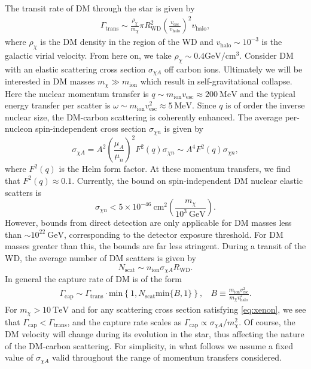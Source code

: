 \documentclass[preprintnumbers,amsmath,amssymb,prd,superscriptaddress]{revtex4}
\newcommand{\TeV}{\text{TeV}}
\newcommand{\GeV}{\text{GeV}}
\newcommand{\MeV}{\text{MeV}}
\newcommand{\cm}{\text{cm}}
\def\r{\right)}
\def\l{\left(}
\begin{document}
The transit rate of DM through the star is given by
\begin{align}
  \Gamma_\text{trans} \sim
  \frac{\rho_{\chi}}{m_\chi} \pi R_\text{WD}^2
  \l\frac{v_\text{esc}}{v_\text{halo}}\r^2 v_\text{halo},
\end{align}
where $\rho_\chi$ is the DM density in the region of the WD and $v_\text{halo} \sim 10^{-3}$ is the galactic virial velocity. 
From here on, we take $\rho_\chi \sim 0.4 \GeV/\cm^3$. 
Consider DM with an elastic scattering cross section $\sigma_{\chi A}$ off carbon ions. 
Ultimately we will be interested in DM masses $m_\chi \gg m_\text{ion}$ which result in self-gravitational collapse. 
Here the nuclear momentum transfer is $q \sim m_\text{ion} v_\text{esc} \approx 200 ~\text{MeV}$ and the typical energy transfer per scatter is $\omega \sim m_\text{ion} v_\text{esc}^2 \approx 5 ~\MeV$. 
Since $q$ is of order the inverse nuclear size, the DM-carbon scattering is coherently enhanced.  
The average per-nucleon spin-independent cross section $\sigma_{\chi n}$ is given by
\begin{equation}
\sigma_{\chi A} = A^2 \l \frac{\mu_{A}}{\mu_{n}}\r^2 F^2(q) \sigma_{\chi n} \sim A^4 F^2(q) \sigma_{\chi n},
\end{equation}
where $F^2(q)$ is the Helm form factor. 
At these momentum transfers, we find that $F^2(q) \approx 0.1$.
Currently, the bound on spin-independent DM nuclear elastic scatters is
\begin{equation}
\label{eq:xenon}
\sigma_{\chi n} < 5 \times 10^{-46} ~\text{cm}^2 \l \frac{m_\chi}{10^3 ~\GeV} \r.
\end{equation}
However, bounds from direct detection are only applicable for DM masses less than $\sim 10^{22} ~\GeV$, corresponding to the detector exposure threshold. 
For DM masses greater than this, the bounds are far less stringent. 
During a transit of the WD, the average number of DM scatters is given by
\begin{equation}
N_\text{scat} \sim n_\text{ion} \sigma_{\chi A} R_\text{WD}.
\end{equation}
In general the capture rate of DM is of the form
\begin{align}
  \Gamma_\text{cap} \sim \Gamma_\text{trans} \cdot 
  \text{min}\left\{1, N_\text{scat} \text{min}\{B,1\}\right\}, ~~~~ B \equiv \frac{m_\text{ion} v_\text{esc}^2}{m_\chi v_\text{halo}^2}. 
\end{align}
For $m_\chi > 10 ~\TeV$ and for any scattering cross section satisfying \eqref{eq:xenon}, we see that $\Gamma_\text{cap} < \Gamma_\text{trans}$, and the capture rate scales as $\Gamma_\text{cap} \propto \sigma_{\chi A}/m_\chi^2$.
Of course, the DM velocity will change during its evolution in the star, thus affecting the nature of the DM-carbon scattering. 
For simplicity, in what follows we assume a fixed value of $\sigma_{\chi A}$ valid throughout the range of momentum transfers considered. 
\end{document}

